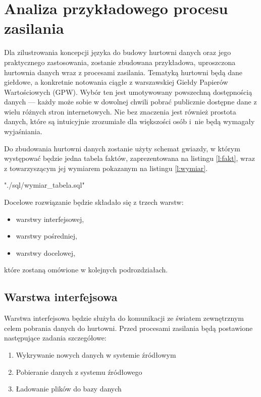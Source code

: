 \section{Analiza przykładowego procesu zasilania} \label{p_r_analiza_procesu}
Dla zilustrowania koncepcji języka do budowy hurtowni danych oraz jego praktycznego zastosowania,
 zostanie zbudowana przykładowa,
 uproszczona hurtownia danych wraz z procesami zasilania. 
Tematyką hurtowni będą dane giełdowe,
 a konkretnie notowania ciągłe z warszawskiej Giełdy Papierów Wartościowych (GPW).
Wybór ten jest umotywowany powszechną dostępnością danych ---
 każdy może sobie w dowolnej chwili pobrać publicznie dostępne dane z wielu różnych stron internetowych.
Nie bez znaczenia jest również prostota danych, które są intuicyjnie zrozumiałe dla większości osób 
 i~nie będą wymagały wyjaśniania.

Do zbudowania hurtowni danych zostanie użyty schemat gwiazdy, 
 w którym występować będzie jedna tabela faktów, zaprezentowana na listingu \ref{l:fakt},
 wraz z towarzyszącym jej wymiarem pokazanym na listingu \ref{l:wymiar}.
 
 {"./sql/wymiar_tabela.sql"} 

 
Docelowe rozwiązanie będzie składało się z trzech warstw:
 \begin{itemize}
  \item warstwy interfejsowej,
  \item warstwy pośredniej,
  \item warstwy docelowej,
 \end{itemize}
które zostaną omówione w kolejnych podrozdziałach.

\subsection{Warstwa interfejsowa}

Warstwa interfejsowa będzie służyła do komunikacji ze światem zewnętrznym celem pobrania danych do hurtowni. 
Przed procesami zasilania będą postawione następujące zadania szczegółowe:
\begin{enumerate}
 \item \label{w_intf:wykrywanie}
 Wykrywanie nowych danych w systemie źródłowym
 \item \label{w_inf:pobieranie}
 Pobieranie danych z systemu źródłowego
 \item \label{w_intf_ladowanie}
Ładowanie plików do bazy danych                 
        
\end{enumerate}

